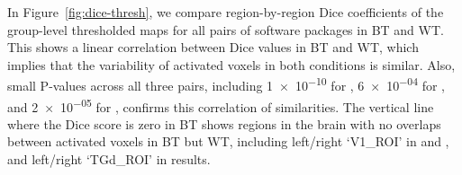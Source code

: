 \documentclass[conference]{IEEEtran}
\begin{document}
In Figure~\ref{fig:dice-thresh}, we compare region-by-region Dice coefficients of
the group-level thresholded maps for all pairs of software packages in BT and WT.
This shows a linear correlation between Dice values in BT and WT,
which implies that the variability of activated voxels in both conditions is similar.
Also, small P-values across all three pairs, including \num{1e-10} for \fslafni, \num{6e-04} for \fslspm,
and \num{2e-05} for \afnispm, confirms this correlation of similarities.
The vertical line where the Dice score is zero in BT shows regions in the brain with no overlaps between activated voxels in BT but WT,
including left/right `V1\_ROI' in \fslafni and \fslspm, and left/right `TGd\_ROI' in \afnispm results.

\end{document}
